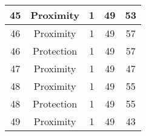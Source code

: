 \documentclass[results.tex]{subfiles}
\begin{document}
\begin{center}
\begin{tabular}{| c || c | c | c | c |}
    \hline
    45 & Proximity & 1 & 49 & 53 \\ 
    \hline
    46 & Proximity & 1 & 49 & 57 \\ 
    \hline
    46 & Protection & 1 & 49 & 57 \\ 
    \hline
    47 & Proximity & 1 & 49 & 47 \\ 
    \hline
    48 & Proximity & 1 & 49 & 55 \\ 
    \hline
    48 & Protection & 1 & 49 & 55 \\ 
    \hline
    49 & Proximity & 1 & 49 & 43 \\ 
    \hline   \end{tabular}
\end{center}
\end{document}
